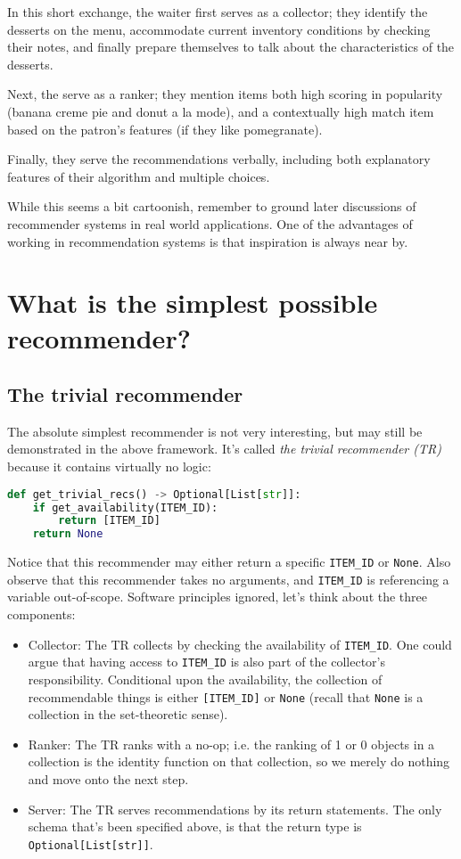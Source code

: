 In this short exchange, the waiter first serves as a collector; they identify the desserts on the menu, accommodate current inventory conditions by checking their notes, and finally prepare themselves to talk about the characteristics of the desserts.

Next, the serve as a ranker; they mention items both high scoring in popularity (banana creme pie and donut a la mode), and a contextually high match item based on the patron's features (if they like pomegranate).

Finally, they serve the recommendations verbally, including both explanatory features of their algorithm and multiple choices. 

While this seems a bit cartoonish, remember to ground later discussions of recommender systems in real world applications. One of the advantages of working in recommendation systems is that inspiration is always near by.

\section{What is the simplest possible recommender?}

\subsection{The trivial recommender}

The absolute simplest recommender is not very interesting, but may still be demonstrated in the above framework. It's called \emph{the trivial recommender (TR)} because it contains virtually no logic:

\begin{lstlisting}[language=Python]
def get_trivial_recs() -> Optional[List[str]]:
    if get_availability(ITEM_ID):
	    return [ITEM_ID]
    return None
\end{lstlisting}


Notice that this recommender may either return a specific \lstinline{ITEM_ID} or \lstinline{None}. Also observe that this recommender takes no arguments, and \lstinline{ITEM_ID} is referencing a variable out-of-scope. Software principles ignored, let's think about the three components:
\begin{itemize}
    \item Collector: The TR collects by checking the availability of \lstinline{ITEM_ID}. One could argue that having access to \lstinline{ITEM_ID} is also part of the collector's responsibility. Conditional upon the availability, the collection of recommendable things is either \lstinline{[ITEM_ID]} or \lstinline{None} (recall that \lstinline{None} is a collection in the set-theoretic sense).
    \item Ranker: The TR ranks with a no-op; i.e. the ranking of 1 or 0 objects in a collection is the identity function on that collection, so we merely do nothing and move onto the next step.
    \item Server: The TR serves recommendations by its return statements. The only schema that's been specified above, is that the return type is \lstinline{Optional[List[str]]}. 

\end{itemize}

